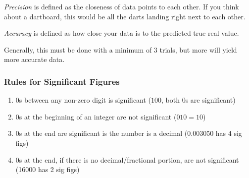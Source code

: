 \begin{definition}[Precision] \label{def:Precision}
  \emph{Precision} is defined as the closeness of data points to each other.
  If you think about a dartboard, this would be all the darts landing right next to each other.
\end{definition}

\begin{definition}[Accuracy] \label{def:Accuracy}
  \emph{Accuracy} is defined as how close your data is to the predicted true real value.
  \begin{remark}
    Generally, this must be done with a minimum of 3 trials, but more will yield more accurate data.
  \end{remark}
\end{definition}

\subsubsection{Rules for Significant Figures} \label{subsec:Rules for Sig Figs}
\begin{enumerate}
\item 0s between any non-zero digit is significant ($100$, both 0s are significant)
\item 0s at the beginning of an integer are not significant ($010 = 10$)
\item 0s at the end are significant is the number is a decimal (0.003050 has 4 sig figs)
\item 0s at the end, if there is no decimal/fractional portion, are not significant (16000 has 2 sig figs)
\end{enumerate}

  